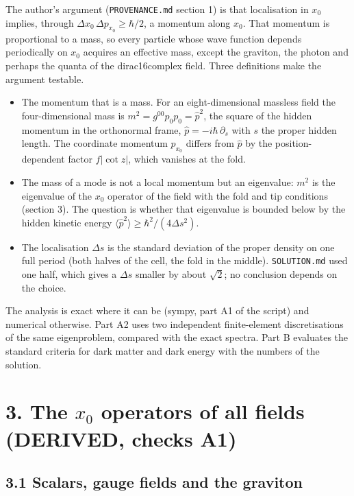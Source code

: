 \documentclass[11pt]{article}
\begin{document}
The author's argument (\texttt{PROVENANCE.\allowbreak{}md} section 1) is that localisation in $x_0$ implies, through $\Delta x_0\,\Delta p_{x_0} \geq \hbar/2$, a momentum along $x_0$. That momentum is proportional to a mass, so every particle whose wave function depends periodically on $x_0$ acquires an effective mass, except the graviton, the photon and perhaps the quanta of the dirac16complex field. Three definitions make the argument testable.

\begin{itemize}
\item The momentum that is a mass. For an eight-dimensional massless field the four-dimensional mass is $m^2 = g^{00}p_0p_0 = \hat p^2$, the square of the hidden momentum in the orthonormal frame, $\hat p = -i\hbar\,\partial_s$ with $s$ the proper hidden length. The coordinate momentum $p_{x_0}$ differs from $\hat p$ by the position-dependent factor $f|\cot z|$, which vanishes at the fold.
\item The mass of a mode is not a local momentum but an eigenvalue: $m^2$ is the eigenvalue of the $x_0$ operator of the field with the fold and tip conditions (section 3). The question is whether that eigenvalue is bounded below by the hidden kinetic energy $\langle\hat p^2\rangle \geq \hbar^2/(4\Delta s^2)$.
\item The localisation $\Delta s$ is the standard deviation of the proper density on one full period (both halves of the cell, the fold in the middle). \texttt{SOLUTION.\allowbreak{}md} used one half, which gives a $\Delta s$ smaller by about $\sqrt2$; no conclusion depends on the choice.
\end{itemize}

The analysis is exact where it can be (sympy, part A1 of the script) and numerical otherwise. Part A2 uses two independent finite-element discretisations of the same eigenproblem, compared with the exact spectra. Part B evaluates the standard criteria for dark matter and dark energy with the numbers of the solution.

\section*{3. The $x_0$ operators of all fields (DERIVED, checks A1)}

\subsection*{3.1 Scalars, gauge fields and the graviton}
\end{document}
